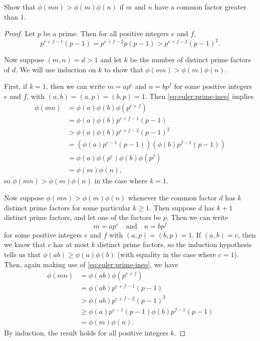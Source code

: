  Show that $\phi(mn) > \phi(m)\phi(n)$ if $m$ and $n$
have a common factor greater than $1$.
\begin{proof}
  Let $p$ be a prime. Then for all positive integers $e$ and $f$,
  \begin{equation}
    \label{eq:euler:prime-ineq}
    p^{e+f-1}(p - 1) = p^{e+f-2}p(p - 1) > p^{e+f-2}(p - 1)^2.
  \end{equation}

  Now suppose $(m,n) = d > 1$ and let $k$ be the number of distinct
  prime factors of $d$. We will use induction on $k$ to show that
  $\phi(mn) > \phi(m)\phi(n)$.

  First, if $k = 1$, then we can write $m = ap^e$ and $n = bp^f$ for
  some positive integers $e$ and $f$, with
  $(a,b) = (a,p) = (b,p) = 1$. Then \eqref{eq:euler:prime-ineq}
  implies
  \begin{align*}
    \phi(mn) &= \phi(a)\phi(b)\phi(p^{e+f}) \\
             &= \phi(a)\phi(b)p^{e+f-1}(p-1) \\
             &> \phi(a)\phi(b)p^{e+f-2}(p-1)^2 \\
             &= \left(\phi(a)p^{e-1}(p-1)\right)
               \left(\phi(b)p^{f-1}(p-1)\right) \\
             &= \phi(a)\phi(p^e)\phi(b)\phi(p^f) \\
             &= \phi(m)\phi(n),
  \end{align*}
  so $\phi(mn) > \phi(m)\phi(n)$ in the case where $k = 1$.

  Now suppose $\phi(mn) > \phi(m)\phi(n)$ whenever the common factor
  $d$ has $k$ distinct prime factors for some particular
  $k\geq1$. Then suppose $d$ has $k+1$ distinct prime factors, and let
  one of the factors be $p$. Then we can write
  \begin{equation*}
    m = ap^e
    \quad\text{and}\quad
    n = bp^f
  \end{equation*}
  for some positive integers $e$ and $f$ with $(a,p) = (b,p) = 1$. If
  $(a,b) = c$, then we know that $c$ has at most $k$ distinct prime
  factors, so the induction hypothesis tells us that
  $\phi(ab)\geq\phi(a)\phi(b)$ (with equality in the case where
  $c = 1$). Then, again making use of \eqref{eq:euler:prime-ineq}, we
  have
  \begin{align*}
    \phi(mn) &= \phi(ab)\phi(p^{e+f}) \\
             &= \phi(ab)p^{e+f-1}(p-1) \\
             &> \phi(ab)p^{e+f-2}(p-1)^2 \\
             &\geq \phi(a)p^{e-1}(p-1)\phi(b)p^{f-1}(p-1) \\
             &= \phi(m)\phi(n).
  \end{align*}
  By induction, the result holds for all positive integers $k$.
\end{proof}

